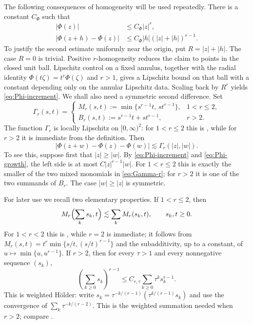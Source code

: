 \documentclass[10pt,a4paper]{amsart}
\numberwithin{equation}{section}
\begin{document}
The following consequences of homogeneity will be used repeatedly.  There is
a constant $C_\Phi$ such that
\begin{align}
 |\Phi(z)|&\le C_\Phi |z|^r,                                      \label{eq:Phi-growth}\\
 |\Phi(z+h)-\Phi(z)|
 &\le C_\Phi |h|(|z|+|h|)^{r-1}.                                 \label{eq:Phi-increment}
\end{align}
To justify the second estimate uniformly near the origin, put
$R=|z|+|h|$.  The case $R=0$ is trivial.  Positive $r$-homogeneity reduces the
claim to points in the closed unit ball.  Lipschitz control on a fixed annulus,
together with the radial identity
$\Phi(t\zeta)=t^r\Phi(\zeta)$ and $r>1$, gives a Lipschitz bound on that
ball with a constant depending only on the annular Lipschitz data.  Scaling
back by $R^r$ yields \eqref{eq:Phi-increment}.  We shall also need a symmetric
second difference.  Set
\begin{equation}\label{eq:Gamma-r}
 \Gamma_r(s,t)=
 \begin{cases}
  M_r(s,t):=\min\{s^{r-1}t,\,st^{r-1}\},&1<r\le2,\\[2mm]
  B_r(s,t):=s^{r-1}t+st^{r-1},&r>2.
 \end{cases}
\end{equation}
The function $\Gamma_r$ is locally Lipschitz on $[0,\infty)^2$: for
$1<r\le2$ this is \cite[Lemma~6.8]{Stolyarov24}, while for $r>2$ it is
immediate from the definition.
Then
\begin{equation}\label{eq:Phi-second-difference}
 |\Phi(z+w)-\Phi(z)-\Phi(w)|
 \lesssim \Gamma_r(|z|,|w|).
\end{equation}
To see this, suppose first that $|z|\ge|w|$.  By
\eqref{eq:Phi-increment} and \eqref{eq:Phi-growth}, the left side is at most
$C|z|^{r-1}|w|$.  For $1<r\le2$ this is exactly the smaller of the two mixed
monomials in \eqref{eq:Gamma-r}; for $r>2$ it is one of the two summands of
$B_r$.  The case $|w|\ge|z|$ is symmetric.

For later use we recall two elementary properties.  If $1<r\le2$, then
\begin{equation}\label{eq:Mr-subadditive}
 M_r\Bigl(\sum_k s_k,t\Bigr)\lesssim\sum_k M_r(s_k,t),
 \qquad s_k,t\ge0.
\end{equation}
For $1<r<2$ this is \cite[Lemma~6.9]{Stolyarov24}, while $r=2$ is immediate; it follows from
$M_r(s,t)=t^r\min\{s/t,(s/t)^{r-1}\}$ and the subadditivity, up to a constant,
of $u\mapsto\min\{u,u^{r-1}\}$.  If $r>2$, then for every $\tau>1$ and every
nonnegative sequence $(s_k)$,
\begin{equation}\label{eq:weighted-holder}
 \left(\sum_{k\ge0}s_k\right)^{r-1}
 \le C_{r,\tau}\sum_{k\ge0}\tau^k s_k^{r-1}.
\end{equation}
This is weighted H\"older: write
$s_k=\tau^{-k/(r-1)}(\tau^{k/(r-1)}s_k)$ and use the convergence of
$\sum_k\tau^{-k/(r-2)}$.  This is the weighted summation needed when $r>2$; compare
\cite[Section~5]{Stolyarov24}.
\end{document}
